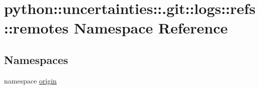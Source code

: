 \hypertarget{namespacepython_1_1uncertainties_1_1_8git_1_1logs_1_1refs_1_1remotes}{
\section{python::uncertainties::.git::logs::refs::remotes Namespace Reference}
\label{namespacepython_1_1uncertainties_1_1_8git_1_1logs_1_1refs_1_1remotes}
}
\subsection*{Namespaces}
\begin{DoxyCompactItemize}
\item 
namespace \hyperlink{namespacepython_1_1uncertainties_1_1_8git_1_1logs_1_1refs_1_1remotes_1_1origin}{origin}
\end{DoxyCompactItemize}
